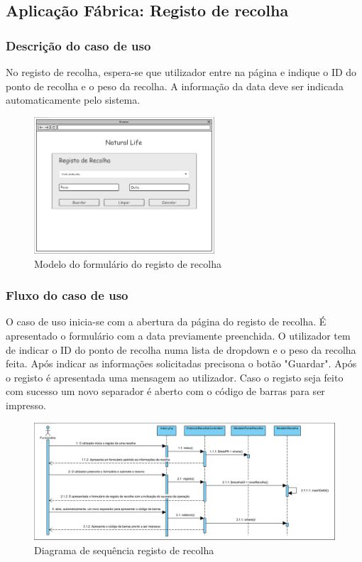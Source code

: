 \subsection{Aplicação Fábrica: Registo de recolha}
\subsubsection*{Descrição do caso de uso}
No registo de recolha, espera-se que utilizador entre na página e indique o ID do ponto de recolha e o peso da recolha. A informação da data deve ser indicada automaticamente pelo sistema. 

\begin{figure}[H] 
	\begin{center}
		\includegraphics[width=0.60\textwidth,keepaspectratio]{figuras/Diagramas_vp/DI_Fabrica_2-Registo_de_Recolha.png}
		\caption{Modelo do formulário do registo de recolha}
		\label{fig:di_recolha} 
	\end{center}
\end{figure}

\subsubsection*{Fluxo do caso de uso}
O caso de uso inicia-se com a abertura da página do registo de recolha. É apresentado o formulário com a data previamente preenchida. O utilizador tem de indicar o ID do ponto de recolha numa lista de dropdown e o peso da recolha feita. Após indicar as informações solicitadas precisona o botão "Guardar". Após o registo é apresentada uma mensagem ao utilizador. Caso o registo seja feito com sucesso um novo separador é aberto com o código de barras para ser impresso.


\begin{figure}[H] 
	\begin{center}
		\includegraphics[width=\textwidth,keepaspectratio]{figuras/Diagramas_vp/SD_Fabrica_2-Registo_de_Recolhas.png}
		\caption{Diagrama de sequência registo de recolha}
		\label{fig:sd_recolha} 
	\end{center}
\end{figure}